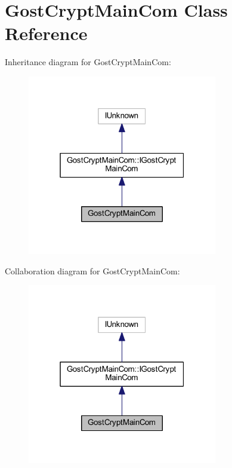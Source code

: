 \hypertarget{class_gost_crypt_main_com}{}\section{Gost\+Crypt\+Main\+Com Class Reference}
\label{class_gost_crypt_main_com}


Inheritance diagram for Gost\+Crypt\+Main\+Com\+:
\nopagebreak
\begin{figure}[H]
\begin{center}
\leavevmode
\includegraphics[width=235pt]{class_gost_crypt_main_com__inherit__graph}
\end{center}
\end{figure}


Collaboration diagram for Gost\+Crypt\+Main\+Com\+:
\nopagebreak
\begin{figure}[H]
\begin{center}
\leavevmode
\includegraphics[width=235pt]{class_gost_crypt_main_com__coll__graph}
\end{center}
\end{figure}
